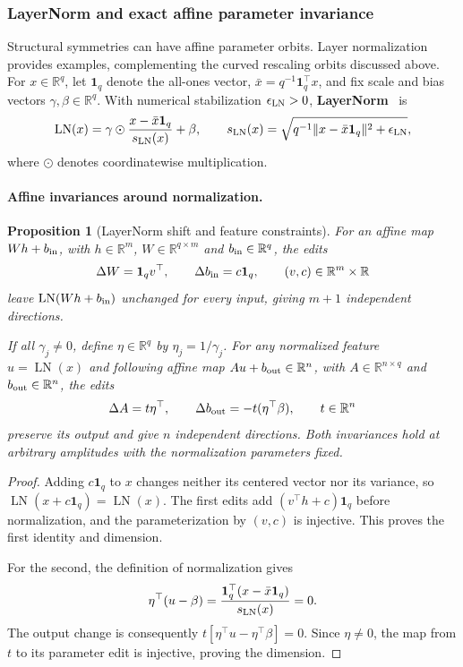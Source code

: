 \documentclass[twoside]{article}
\newtheorem{proposition}[theorem]{Proposition}
\theoremstyle{remark}
\newcommand{\R}{\mathbb R}
\theoremstyle{highlightdefinition}
\theoremstyle{remark}
\begin{document}
\subsubsection{LayerNorm and exact affine parameter invariance}
\label{app:layernorm}
Structural symmetries can have affine parameter orbits. Layer normalization provides examples, complementing the curved rescaling orbits discussed above. For $x\in\R^q$, let $\mathbf1_q$ denote the all-ones vector, $\bar x=q^{-1}\mathbf1_q^\top x$, and fix scale and bias vectors $\gamma,\beta\in\R^q$. With numerical stabilization $\epsilon_{\rm LN}>0$, \textbf{LayerNorm}~\citep{ba2016layernorm} is
\[
 \operatorname{LN}(x)=\gamma\odot\frac{x-\bar x\mathbf1_q}{s_{\rm LN}(x)}+\beta,
 \qquad s_{\rm LN}(x)=\sqrt{q^{-1}\|x-\bar x\mathbf1_q\|^2+\epsilon_{\rm LN}},
\]
where $\odot$ denotes coordinatewise multiplication.

\paragraph{Affine invariances around normalization.}
\begin{proposition}[LayerNorm shift and feature constraints]
For an affine map $Wh+b_{\rm in}$, with $h\in\R^m$, $W\in\R^{q\times m}$ and $b_{\rm in}\in\R^q$, the edits
\[
 \Delta W=\mathbf1_qv^\top,\qquad \Delta b_{\rm in}=c\mathbf1_q,
 \qquad (v,c)\in\R^m\times\R
\]
leave $\operatorname{LN}(Wh+b_{\rm in})$ unchanged for every input, giving $m+1$ independent directions.

If all $\gamma_j\ne0$, define $\eta\in\R^q$ by $\eta_j=1/\gamma_j$. For any normalized feature $u=\operatorname{LN}(x)$ and following affine map $Au+b_{\rm out}\in\R^n$, with $A\in\R^{n\times q}$ and $b_{\rm out}\in\R^n$, the edits
\[
 \Delta A=t\eta^\top,\qquad \Delta b_{\rm out}=-t(\eta^\top\beta),\qquad t\in\R^n
\]
preserve its output and give $n$ independent directions. Both invariances hold at arbitrary amplitudes with the normalization parameters fixed.
\end{proposition}
\begin{proof}
Adding $c\mathbf1_q$ to $x$ changes neither its centered vector nor its variance, so $\operatorname{LN}(x+c\mathbf1_q)=\operatorname{LN}(x)$. The first edits add $(v^\top h+c)\mathbf1_q$ before normalization, and the parameterization by $(v,c)$ is injective. This proves the first identity and dimension.

For the second, the definition of normalization gives
\[
 \eta^\top(u-\beta)=\frac{\mathbf1_q^\top(x-\bar x\mathbf1_q)}{s_{\rm LN}(x)}=0.
\]
The output change is consequently $t[\eta^\top u-\eta^\top\beta]=0$. Since $\eta\ne0$, the map from $t$ to its parameter edit is injective, proving the dimension.
\end{proof}
\end{document}
